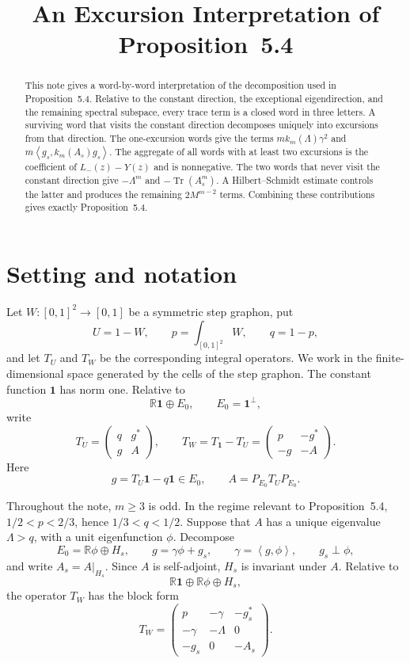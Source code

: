 \documentclass[11pt]{article}
\title{An Excursion Interpretation of Proposition~5.4}
\author{}
\date{}
\newcommand{\Tr}{\operatorname{Tr}}
\newcommand{\ip}[2]{\left\langle #1,#2\right\rangle}
\begin{document}
\maketitle

\begin{abstract}
This note gives a word-by-word interpretation of the decomposition used in
Proposition~5.4.  Relative to the constant direction, the exceptional
eigendirection, and the remaining spectral subspace, every trace term is a
closed word in three letters.  A surviving word that visits the constant
direction decomposes uniquely into excursions from that direction.  The
one-excursion words give the terms $m k_m(\Lambda)\gamma^2$ and
$m\ip{g_s}{k_m(A_s)g_s}$.  The aggregate of all words with at least two
excursions is the coefficient of $L_-(z)-Y(z)$ and is nonnegative.  The two
words that never visit the constant direction give $-\Lambda^m$ and
$-\Tr(A_s^m)$.  A Hilbert--Schmidt estimate controls the latter and produces
the remaining $2M^{m-2}$ terms.  Combining these contributions gives exactly
Proposition~5.4.
\end{abstract}

\section{Setting and notation}

Let $W\colon[0,1]^2\to[0,1]$ be a symmetric step graphon, put
\[
  U=1-W,\qquad p=\int_{[0,1]^2}W,\qquad q=1-p,
\]
and let $T_U$ and $T_W$ be the corresponding integral operators.  We work in
the finite-dimensional space generated by the cells of the step graphon.  The
constant function $\mathbf 1$ has norm one.  Relative to
\[
  \mathbb R\mathbf 1\oplus E_0,
  \qquad E_0=\mathbf 1^\perp,
\]
write
\[
  T_U=
  \begin{pmatrix}
    q & g^*\\
    g & A
  \end{pmatrix},
  \qquad
  T_W=T_{\mathbf 1}-T_U=
  \begin{pmatrix}
    p & -g^*\\
    -g & -A
  \end{pmatrix}.
  \tag{1.1}
\]
Here
\[
  g=T_U\mathbf 1-q\mathbf 1\in E_0,
  \qquad A=P_{E_0}T_UP_{E_0}.
\]

Throughout the note, $m\geq3$ is odd.  In the regime relevant to
Proposition~5.4, $1/2<p<2/3$, hence $1/3<q<1/2$.  Suppose that $A$ has a
unique eigenvalue $\Lambda>q$, with a unit eigenfunction $\phi$.  Decompose
\[
  E_0=\mathbb R\phi\oplus H_s,
  \qquad
  g=\gamma\phi+g_s,
  \qquad
  \gamma=\ip{g}{\phi},
  \qquad g_s\perp\phi,
  \tag{1.2}
\]
and write $A_s=A|_{H_s}$.  Since $A$ is self-adjoint, $H_s$ is invariant
under $A$.  Relative to
\[
  \mathbb R\mathbf 1\oplus\mathbb R\phi\oplus H_s,
\]
the operator $T_W$ has the block form
\[
  T_W=
  \begin{pmatrix}
    p & -\gamma & -g_s^*\\
    -\gamma & -\Lambda & 0\\
    -g_s & 0 & -A_s
  \end{pmatrix}.
  \tag{1.3}
\]
\end{document}
